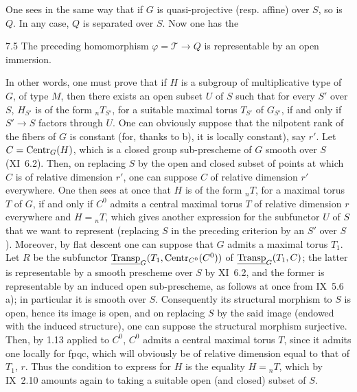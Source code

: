 One sees in the same way that if $G$ is quasi-projective (resp. affine) over $S$, so is $Q$. In any case, $Q$ is separated over $S$. Now one has the
\begin{lemma}{7.5}\label{XII.7.5}
The preceding homomorphism $\varphi=\mathscr T\to Q$ is representable by an open immersion.
\end{lemma}
In other words, one must prove that if $H$ is a subgroup of multiplicative type of $G$, of type $M$, then there exists an open subset $U$ of $S$ such that for every $S'$ over $S$, $H_{S'}$ is of the form ${}_nT_{S'}$, for a suitable maximal torus $T_{S'}$ of $G_{S'}$, if and only if $S'\to S$ factors through $U$. One can obviously suppose that the nilpotent rank of the fibers of $G$ is constant (for, thanks to b), it is locally constant), say $r'$. Let $C=\operatorname{Centr}_G(H)$, which is a closed group sub-prescheme of $G$ smooth over $S$ (XI~6.2). Then, on replacing $S$ by the open and closed subset of points at which $C$ is of relative dimension $r'$, one can suppose $C$ of relative dimension $r'$ everywhere. One then sees at once that $H$ is of the form ${}_nT$, for a maximal torus $T$ of $G$, if and only if $C^0$ admits a central maximal torus $T$ of relative dimension $r$ everywhere and $H={}_nT$, which gives another expression for the subfunctor $U$ of $S$ that we want to represent (replacing $S$ in the preceding criterion by an $S'$ over $S$). Moreover, by flat descent one can suppose that $G$ admits a maximal torus $T_1$. Let $R$ be the subfunctor $\underline{\operatorname{Transp}}_G(T_1,\operatorname{Centr}_{C^0}(C^0))$ of $\underline{\operatorname{Transp}}_G(T_1,C)$; the latter is representable by a smooth prescheme over $S$ by XI~6.2, and the former is representable by an induced open sub-prescheme, as follows at once from IX~5.6 a); in particular it is smooth over $S$. Consequently its structural morphism to $S$ is open, hence its image is open, and on replacing $S$ by the said image (endowed with the induced structure), one can suppose the structural morphism surjective. Then, by 1.13 applied to $C^0$, $C^0$ admits a central maximal torus $T$, since it admits one locally for fpqc, which will obviously be of relative dimension equal to that of $T_1$, \ie $r$. Thus the condition to express for $H$ is the equality $H={}_nT$, which by IX~2.10 amounts again to taking a suitable open (and closed) subset of $S$.

